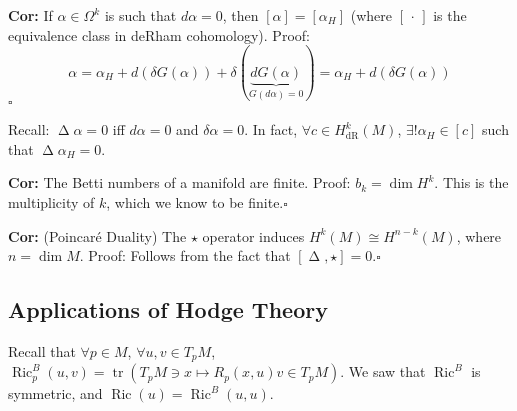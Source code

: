 \documentclass[10pt,letterpaper]{article}
\newcommand{\n}{\hfill\break}
\newcommand{\nn}{\vspace{0.5\baselineskip}\n}
\newcommand{\hangblock}[2]{\par\noindent\settowidth{\hangindent}{\textbf{#1: }}\textbf{#1: }\nolinebreak#2}
\newcommand{\cor}[1]{\hangblock{Cor}{#1}}
\newcommand{\proven}{\;$\square$\n}
\newcommand{\comm}[1]{\left[#1\right]}
\DeclareMathOperator{\Ric}{Ric}
\DeclareMathOperator{\Laplacian}{\Delta}
\DeclareMathOperator{\dR}{dR}
\DeclareMathOperator{\tr}{tr}
\newcommand{\unique}{!}
\begin{document}
\cor{
	If $\alpha\in\Omega^{k}$ is such that $d\alpha=0$, then $[\alpha]=[\alpha_{H}]$ (where $[\,\cdot\,]$ is the equivalence class in deRham cohomology).\nn
	Proof:
	\[
		\alpha=\alpha_{H}+d(\delta{}G(\alpha))+\delta(\underbrace{dG(\alpha)}_{G(d\alpha)=0})=\alpha_{H}+d(\delta{}G(\alpha))
	\]
	\proven
}

\par\noindent
Recall: $\Laplacian\alpha=0$ iff $d\alpha=0$ and $\delta\alpha=0$. In fact, $\forall{}c\in{}H^{k}_{\dR}(M)$, $\exists\unique\alpha_{H}\in[c]$ such that $\Laplacian\alpha_{H}=0$.\n

\cor{
	The Betti numbers of a manifold are finite.\nn
	Proof: $b_{k}=\dim{}H^{k}$. This is the multiplicity of $k$, which we know to be finite.\proven
}

\cor{
	(Poincar\'e Duality) The $\star$ operator induces $H^{k}(M)\cong{}H^{n-k}(M)$, where $n=\dim{}M$.\nn
	Proof: Follows from the fact that $\comm{\Laplacian,\star}=0$.\proven
}

\subsection*{Applications of Hodge Theory}

\par\noindent
Recall that $\forall{}p\in{}M$, $\forall{}u,v\in{}T_{p}M$, $\Ric_{p}^{B}(u,v)=\tr(T_{p}M\ni{}x\mapsto{}R_{p}(x,u)v\in{}T_{p}M)$. We saw that $\Ric^{B}$ is symmetric, and $\Ric(u)=\Ric^{B}(u,u)$.\n
\end{document}
